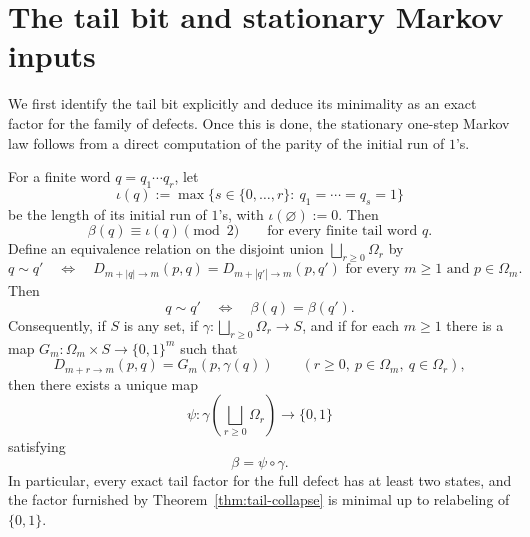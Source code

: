 \section{The tail bit and stationary Markov inputs}
\label{sec:markov}

We first identify the tail bit explicitly and deduce its minimality as an
exact factor for the family of defects.  Once this is done, the stationary
one-step Markov law follows from a direct computation of the parity of the
initial run of $1$'s.

\begin{theorem}
\label{thm:tail-rigidity}
For a finite word $q=q_1\cdots q_r$, let
\[
\iota(q):=\max\{s\in\{0,\dots,r\}:\ q_1=\cdots=q_s=1\}
\]
be the length of its initial run of $1$'s, with $\iota(\varnothing):=0$.
Then
\[
\beta(q)\equiv \iota(q)\pmod 2
\qquad
\text{for every finite tail word }q.
\]
Define an equivalence relation on the disjoint union
$\bigsqcup_{r\ge 0}\Omega_r$ by
\[
q\sim q'
\quad\Longleftrightarrow\quad
D_{m+|q|\to m}(p,q)=D_{m+|q'|\to m}(p,q')
\text{ for every }m\ge 1\text{ and }p\in\Omega_m.
\]
Then
\[
q\sim q'
\quad\Longleftrightarrow\quad
\beta(q)=\beta(q').
\]
Consequently, if $S$ is any set, if
$\gamma:\bigsqcup_{r\ge 0}\Omega_r\to S$, and if for each $m\ge 1$ there is a
map $G_m:\Omega_m\times S\to\{0,1\}^m$ such that
\[
D_{m+r\to m}(p,q)=G_m(p,\gamma(q))
\qquad
(r\ge 0,\ p\in\Omega_m,\ q\in\Omega_r),
\]
then there exists a unique map
\[
\psi:\gamma\!\left(\bigsqcup_{r\ge 0}\Omega_r\right)\to\{0,1\}
\]
satisfying
\[
\beta=\psi\circ\gamma.
\]
In particular, every exact tail factor for the full defect has at least two
states, and the factor furnished by Theorem~\ref{thm:tail-collapse} is minimal
up to relabeling of $\{0,1\}$.
\end{theorem}

